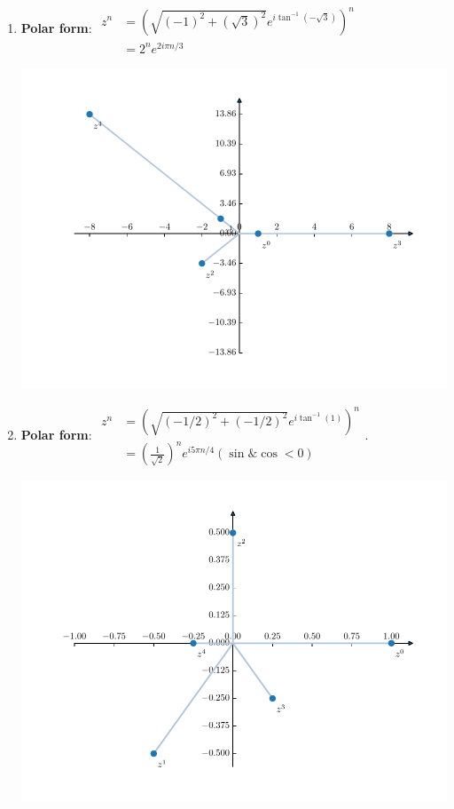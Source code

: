 \documentclass[
    classnum=MATH564,
    classname=MATHEMATICAL\ MODELING,
    due=January\ 28\,\ 2020,
    author=Gabrielle\ Streeter\qquad Hannah\ Wu\qquad\ Minghang\ Li,
    authorshort=Streeter\ \&\ Wu\ \&\ Li,
    teacher= Zachary\ M.\ Boyd,
    hw=1
]{hw-template}
\newenvironment{Figure}
  {\par\medskip\noindent\minipage{\linewidth}}
  {\endminipage\par\medskip}
\begin{document}
\begin{homeworkProblem}
\begin{multicols}{2}
\begin{enumerate}
\item \textbf{Polar form}:
$\begin{aligned}
    z^n &= (\sqrt{(-1)^2 + (\sqrt{3})^2} e^{i\tan^{-1}(-\sqrt{3})})^n\\
    &= 2^n e^{2i\pi n/3}
\end{aligned}$
\begin{Figure}
    \centering
    \includegraphics[scale=0.5]{media/hw1/fig8(d).pdf}
\end{Figure}
\item \textbf{Polar form}:
$\begin{aligned}
    z^n &= (\sqrt{(-1/2)^2+(-1/2)^2} e^{i\tan^{-1}(1)})^n\\
    &=(\frac{1}{\sqrt{2}})^n e^{i5\pi n/4} (\sin \& \cos < 0)
\end{aligned}$.
\begin{Figure}
    \centering
    \includegraphics[scale=0.5]{media/hw1/fig8(e).pdf}
\end{Figure}

\end{enumerate}
\end{multicols}
\end{homeworkProblem}
\end{document}
